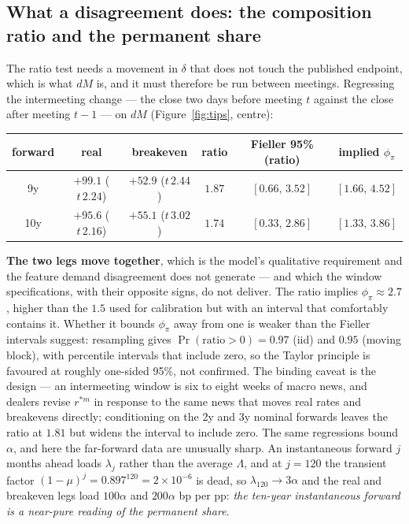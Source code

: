 \documentclass[11pt]{article}
\begin{document}
\subsection{What a disagreement does: the composition ratio and the permanent share}
\label{sec:test-delta}
The ratio test needs a movement in $\delta$ that does not touch the published endpoint, which is
what $dM$ is, and it must therefore be run between meetings. Regressing the intermeeting change
--- the close two days before meeting $t$ against the close after meeting $t-1$ --- on $dM$
(Figure~\ref{fig:tips}, centre):
\begin{center}\small
\begin{tabular}{cccccc}
\toprule
forward & real & breakeven & ratio & Fieller 95\% (ratio) & implied $\phi_\pi$\\
\midrule
9y & $+99.1$ ($t\,2.24$) & $+52.9$ ($t\,2.44$) & $1.87$ & $[0.66,\,3.52]$ & $[1.66,\,4.52]$\\
10y & $+95.6$ ($t\,2.16$) & $+55.1$ ($t\,3.02$) & $1.74$ & $[0.33,\,2.86]$ & $[1.33,\,3.86]$\\
\bottomrule
\end{tabular}
\end{center}
\noindent \textbf{The two legs move together}, which is the model's qualitative requirement and
the feature demand disagreement does not generate --- and which the window specifications, with
their opposite signs, do not deliver. The ratio implies $\phi_\pi\approx2.7$, higher than the
$1.5$ used for calibration but with an interval that comfortably contains it. Whether it bounds
$\phi_\pi$ away from one is weaker than the Fieller intervals suggest: resampling gives
$\Pr(\text{ratio}>0)=0.97$ (iid) and $0.95$ (moving block), with percentile intervals that
include zero, so the Taylor principle is favoured at roughly one-sided 95\%, not confirmed. The
binding caveat is the design --- an intermeeting window is six to eight weeks of macro news, and
dealers revise $r^{*m}$ in response to the same news that moves real rates and breakevens
directly; conditioning on the 2y and 3y nominal forwards leaves the ratio at $1.81$ but widens
the interval to include zero.
The same regressions bound $\alpha$, and here the far-forward data are unusually sharp. An
instantaneous forward $j$ months ahead loads $\lambda_j$ rather than the average $\Lambda$, and
at $j=120$ the transient factor $(1-\mu)^{j}=0.897^{120}=2\times10^{-6}$ is dead, so
$\lambda_{120}\to3\alpha$ and the real and breakeven legs load $100\alpha$ and $200\alpha$ bp
per pp: \emph{the ten-year instantaneous forward is a near-pure reading of the permanent share}.
\end{document}
